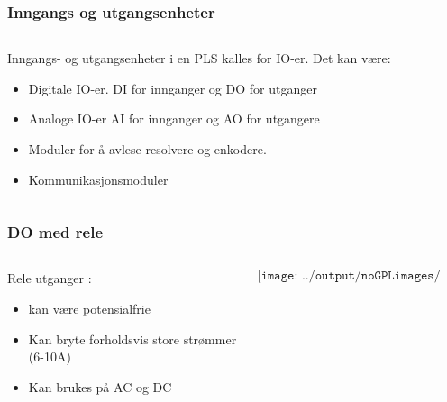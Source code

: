 \documentclass[aspectratio=169,xcolor=dvipsnames]{beamer}
\begin{document}
\begin{frame}
	\frametitle{Inngangs og utgangsenheter}
	\begin{columns}
		\begin{column}{0.5\textwidth}
			Inngangs- og utgangsenheter i en PLS kalles for IO-er. Det kan være:
			\begin{itemize}
				\item Digitale IO-er. DI for innganger og DO for utganger
				\item Analoge IO-er AI for innganger og AO for utgangere
				\item Moduler for å avlese resolvere og enkodere. 
				\item Kommunikasjonsmoduler
			\end{itemize}


			
		\end{column}

		\begin{column}{0.5\textwidth}
		\end{column}
	\end{columns}
\end{frame}
\begin{frame}
	\frametitle{DO med rele}
	\begin{columns}
		\begin{column}{0.5\textwidth}
			Rele utganger :
			\begin{itemize}
				\item kan være potensialfrie
				\item Kan bryte forholdsvis store strømmer (6-10A)
				\item Kan brukes på AC og DC
			\end{itemize}

			
		\end{column}

		\begin{column}{0.5\textwidth}
	$$\texttt{[image: ../output/noGPLimages/pls03.png]}$$
		\end{column}
	\end{columns}
\end{frame}
\end{document}
